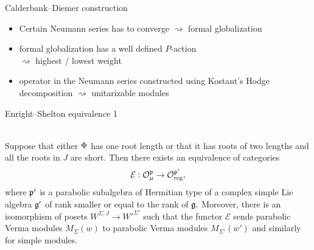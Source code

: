 \documentclass[10pt]{beamer}
\begin{document}
\begin{frame}{Calderbank--Diemer construction}
\begin{itemize}[<+- | alert@+>]
	\item Certain Neumann series has to converge $\rightsquigarrow$ formal globalization
	\item formal globalization has a well defined $P$-action\\ \hspace{1cm} $\rightsquigarrow$ highest / lowest weight
	\item operator in the Neumann series constructed using Kostant's Hodge decomposition $\rightsquigarrow$ unitarizable modules
\end{itemize}
\end{frame}

\begin{frame}{Enright--Shelton equivalence 1}

\begin{theorem} 
\hspace{1em} \\[-1em]
Suppose that either $\Phi$ has one root length or that it has roots of two lengths and all the roots in $J$ are short. Then there exists an equivalence of categories
	\[
	\mathcal{E}: \mathcal{O}^{\mathfrak{p}}_\mu \to \mathcal{O}^{\mathfrak{p'}}_{\mathrm{reg}},
	\]
	where $\mathfrak{p}'$ is a parabolic subalgebra of Hermitian type of a complex simple Lie algebra $\mathfrak{g}'$ of rank \alert{smaller} or equal to the rank of $\mathfrak{g}.$ Moreover, there is an isomorphism of posets $W^{\Sigma, J} \to W'^{\Sigma'}$ such that the functor $\mathcal{E}$ sends parabolic Verma modules $M_\Sigma(w)$ to parabolic Verma modules $M_{\Sigma'} (w')$ and similarly for simple modules.

\end{theorem}

\end{frame}
\end{document}
